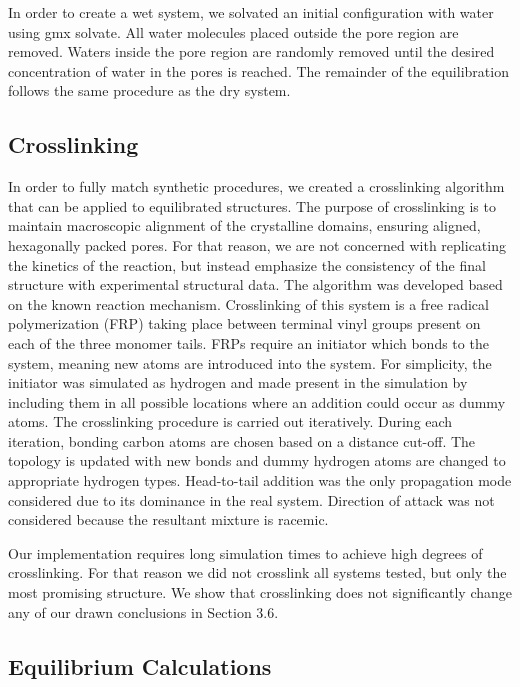 \documentclass{article}
\begin{document}
  In order to create a wet system, we solvated an initial configuration with
  water using gmx solvate. All water molecules placed outside the pore region are
  removed. Waters inside the pore region are randomly removed until the desired
  concentration of water in the pores is reached. The remainder of the
  equilibration follows the same procedure as the dry system. 

  \subsection{Crosslinking}
  

  In order to fully match synthetic procedures, we created a crosslinking
  algorithm that can be applied to equilibrated structures. The purpose of 
  crosslinking
  is to maintain macroscopic alignment of the crystalline domains, 
  ensuring aligned, hexagonally packed pores. For that reason, we are not
  concerned with replicating the kinetics of the reaction, but instead emphasize
  the consistency of the final structure with experimental structural data. The
  algorithm was developed based on the known reaction mechanism. Crosslinking of
  this system is a free radical polymerization (FRP) taking place between
  terminal vinyl groups present on each of the three monomer tails. FRPs require
  an initiator which bonds to the system, meaning new atoms are introduced into
  the system. For simplicity, the initiator was simulated as hydrogen and made
  present in the simulation by including them in all possible locations where an 
  addition could occur as dummy atoms. The crosslinking procedure is carried out
  iteratively. During each iteration, bonding carbon atoms are chosen based on
  a distance cut-off. The topology is updated with new bonds and dummy hydrogen
  atoms are changed to appropriate hydrogen types. Head-to-tail addition was the
  only propagation mode considered due to its dominance in the real system.
  Direction of attack was not considered because the resultant mixture is
  racemic.

  Our implementation requires long simulation times to achieve high degrees
  of crosslinking. For that reason we did not crosslink all systems tested, but only the most
  promising structure. We show that crosslinking does not significantly 
  change any of our drawn conclusions in Section 3.6.

  \subsection{Equilibrium Calculations}
\end{document}
